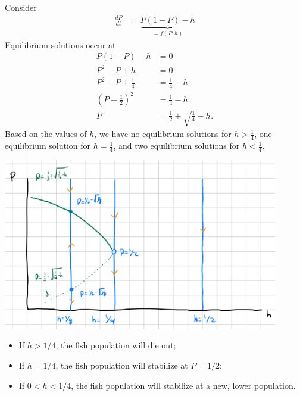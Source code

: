\documentclass[10pt]{mypackage}
\begin{document}
\begin{example}
  Consider
  \begin{align*}
    \frac{dP}{dt} &= \underbrace{P\left(1 - P\right) - h}_{=f(P,h)}
  \end{align*}
  Equilibrium solutions occur at
  \begin{align*}
    P\left(1-P\right) - h &= 0\\
    P^2 - P + h &= 0\\
    P^2 - P + \frac{1}{4} &= \frac{1}{4} - h\\
    \left(P-\frac{1}{2}\right)^2 &= \frac{1}{4} - h\\
    P &= \frac{1}{2} \pm \sqrt{\frac{1}{4} - h}.
  \end{align*}
  Based on the values of $h$, we have no equilibrium solutions for $h > \frac{1}{4}$, one equilibrium solution for $h = \frac{1}{4}$, and two equilibrium solutions for $h < \frac{1}{4}$.
  \begin{center}
    \includegraphics[width=12cm]{images/bifurcation_diagram_2.png}
  \end{center}
  \begin{itemize}
    \item If $h > 1/4$, the fish population will die out;
    \item If $h = 1/4$, the fish population will stabilize at $P = 1/2$;
    \item If $0 < h < 1/4$, the fish population will stabilize at a new, lower population.
  \end{itemize}
\end{example}
\end{document}
